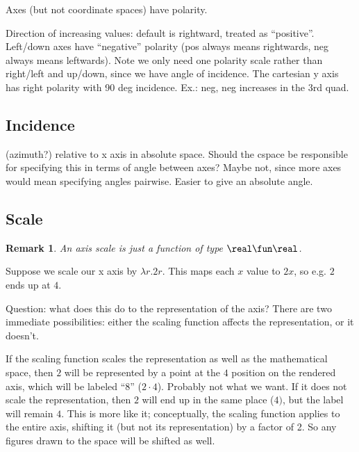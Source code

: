 \documentclass[12pt]{tufte-handout}
\numberwithin{equation}{subsection}
\numberwithin{equation}{subsection}
\newtheorem{remark}{Remark}
\newcommand\cspace{coordinate space}
\begin{document}
{  Axes (but not \cspace{}s) have polarity.

  Direction of increasing values: default is rightward, treated as
  ``positive''.  Left/down axes have ``negative'' polarity (pos always
  means rightwards, neg always means leftwards).  Note we only need one
  polarity scale rather than right/left and up/down, since we have angle
  of incidence.  The cartesian y axis has right polarity with 90 deg
  incidence.  Ex.: neg, neg increases in the 3rd quad.

  \subsection{Incidence}
  \label{subs:incidence}

  (azimuth?) relative to x axis in absolute space.
  Should the cspace be responsible for specifying this in terms of
  angle between axes?  Maybe not, since more axes would mean
  specifying angles pairwise.  Easier to give an absolute angle.

  \subsection{Scale}
  \label{subs:axisscale}

  \begin{remark}
    An axis scale is just a function of type \(\real\fun\real\).
  \end{remark}

  Suppose we scale our x axis by \(\lambda r.2r\).  This maps each \(x\)
  value to \(2x\), so e.g. \(2\) ends up at \(4\).

  Question: what does this do to the representation of the axis?  There
  are two immediate possibilities: either the scaling function affects
  the representation, or it doesn't.

  If the scaling function scales the representation as well as the
  mathematical space, then \(2\) will be represented by a point at the \(4\)
  position on the rendered axis, which will be labeled ``8'' (\(2\cdot
  4\)).  Probably not what we want.  If it does not scale the
  representation, then \(2\) will end up in the same place (\(4)\), but
  the label will remain \(4\).  This is more like it; conceptually, the
  scaling function applies to the entire axis, shifting it (but not its
  representation) by a factor of 2.  So any figures drawn to the space
  will be shifted as well.

}
\end{document}
